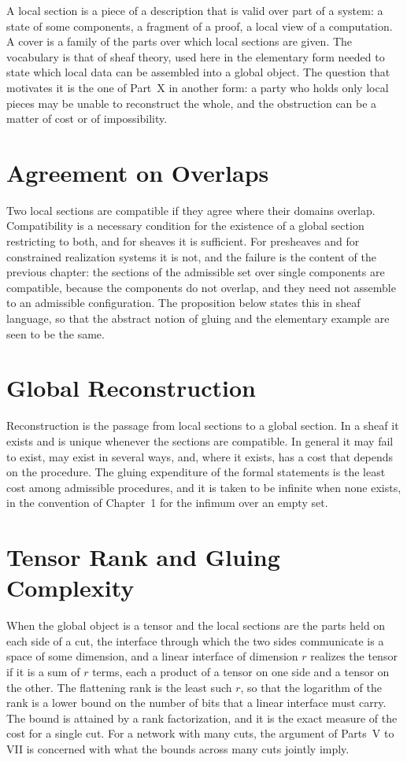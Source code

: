 \documentclass[11pt,letterpaper]{report}
\theoremstyle{plain}
\theoremstyle{definition}
\theoremstyle{remark}
\begin{document}
A local section is a piece of a description that is valid over part of a system: a state of some components, a fragment of a proof, a local view of a computation. A cover is a family of the parts over which local sections are given. The vocabulary is that of sheaf theory, used here in the elementary form needed to state which local data can be assembled into a global object. The question that motivates it is the one of Part~X in another form: a party who holds only local pieces may be unable to reconstruct the whole, and the obstruction can be a matter of cost or of impossibility.

\section{Agreement on Overlaps}

Two local sections are compatible if they agree where their domains overlap. Compatibility is a necessary condition for the existence of a global section restricting to both, and for sheaves it is sufficient. For presheaves and for constrained realization systems it is not, and the failure is the content of the previous chapter: the sections of the admissible set over single components are compatible, because the components do not overlap, and they need not assemble to an admissible configuration. The proposition below states this in sheaf language, so that the abstract notion of gluing and the elementary example are seen to be the same.

\section{Global Reconstruction}

Reconstruction is the passage from local sections to a global section. In a sheaf it exists and is unique whenever the sections are compatible. In general it may fail to exist, may exist in several ways, and, where it exists, has a cost that depends on the procedure. The gluing expenditure of the formal statements is the least cost among admissible procedures, and it is taken to be infinite when none exists, in the convention of Chapter~1 for the infimum over an empty set.

\section{Tensor Rank and Gluing Complexity}

When the global object is a tensor and the local sections are the parts held on each side of a cut, the interface through which the two sides communicate is a space of some dimension, and a linear interface of dimension $r$ realizes the tensor if it is a sum of $r$ terms, each a product of a tensor on one side and a tensor on the other. The flattening rank is the least such $r$, so that the logarithm of the rank is a lower bound on the number of bits that a linear interface must carry. The bound is attained by a rank factorization, and it is the exact measure of the cost for a single cut. For a network with many cuts, the argument of Parts~V to VII is concerned with what the bounds across many cuts jointly imply.
\end{document}
